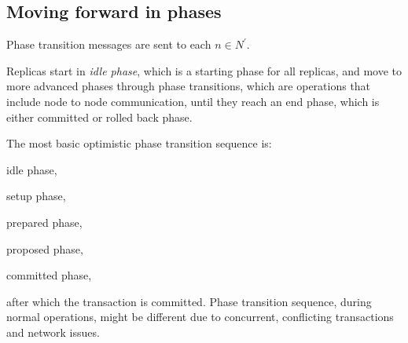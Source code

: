 















\subsection{Moving forward in phases}
Phase transition messages are sent to each $n\in \mathit{N}^'$.

Replicas start in \emph{idle phase}, which is a starting phase for all replicas, and move to more advanced phases through phase transitions, which are operations that include node to node communication, until they reach an end phase, which is either committed or rolled back phase.

The most basic optimistic phase transition sequence is: \begin{enumerate*} \item idle phase, \item setup phase, \item prepared phase, \item proposed phase, \item committed phase, \end{enumerate*} after which the transaction is committed. Phase transition sequence, during normal operations, might be different due to concurrent, conflicting transactions and network issues.


